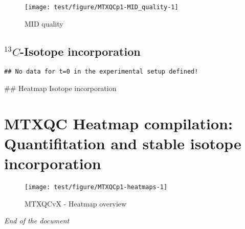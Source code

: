 \documentclass[9pt,]{article}
\begin{document}
\begin{figure}

{\centering \texttt{[image: test/figure/MTXQCp1-MID\_quality-1]} 

}

\caption{MID quality}\label{fig:MID_quality}
\end{figure}

\subsection{\texorpdfstring{\(^{13}C\)-Isotope
incorporation}{\^{}\{13\}C-Isotope incorporation}}\label{c-isotope-incorporation}

\begin{verbatim}
## No data for t=0 in the experimental setup defined!
\end{verbatim}

\clearpage
\#\# Heatmap Isotope incorporation

\section{MTXQC Heatmap compilation: Quantifitation and stable isotope
incorporation}\label{mtxqc-heatmap-compilation-quantifitation-and-stable-isotope-incorporation}

\begin{figure}

{\centering \texttt{[image: test/figure/MTXQCp1-heatmaps-1]} 

}

\caption{MTXQCvX - Heatmap overview}\label{fig:heatmaps}
\end{figure}

\emph{End of the document}
\newpage
\singlespacing 
\end{document}
